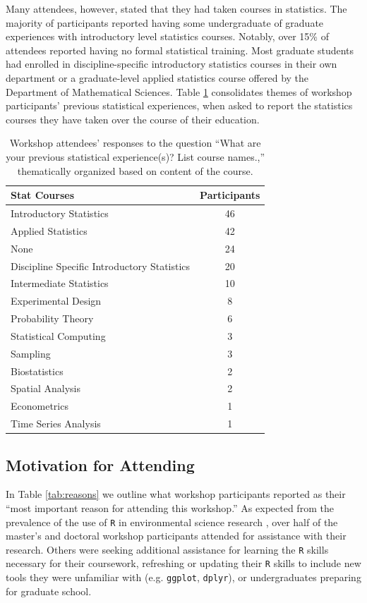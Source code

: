 \documentclass[12pt]{article}
\begin{document}
\quad Many attendees, however, stated that they had taken courses in statistics. The majority of participants reported having some undergraduate of graduate experiences with introductory level statistics courses. Notably, over 15\% of attendees reported having no formal statistical training. Most graduate students had enrolled in discipline-specific introductory statistics courses in their own department or a graduate-level applied statistics course offered by the Department of Mathematical Sciences. Table \ref{tab:statistics} consolidates themes of workshop participants' previous statistical experiences, when asked to report the statistics courses they have taken over the course of their education. 

{
\begin{table}[h!]
    \centering
    \begin{tabular}{lc}
\hline
Stat Courses & Participants \\
\hline
Introductory Statistics & 46 \\
Applied Statistics & 42 \\
None & 24 \\
Discipline Specific Introductory Statistics & 20 \\
Intermediate Statistics & 10 \\
Experimental Design	& 8 \\
Probability Theory	& 6 \\
Statistical Computing & 3 \\
Sampling & 3 \\
Biostatistics & 2 \\
Spatial Analysis & 2 \\
Econometrics & 1 \\
Time Series Analysis & 1 \\
\hline
\end{tabular}
\caption{Workshop attendees' responses to the question ``What are your previous statistical experience(s)?  List course names.,'' thematically organized based on content of the course.}
    \label{tab:statistics}
\end{table}
}

\subsection{Motivation for Attending} 

\quad In Table \ref{tab:reasons} we outline what workshop participants reported as their ``most important reason for attending this workshop.'' As expected from the prevalence of the use of \texttt{R} in environmental science research \citep{Rpopular, mislan}, over half of the master's and doctoral workshop participants attended for assistance with their research. Others were seeking additional assistance for learning the \texttt{R} skills necessary for their coursework, refreshing or updating their \texttt{R} skills to include new tools they were unfamiliar with (e.g. \texttt{ggplot}, \texttt{dplyr}), or undergraduates preparing for graduate school.  
\end{document}
